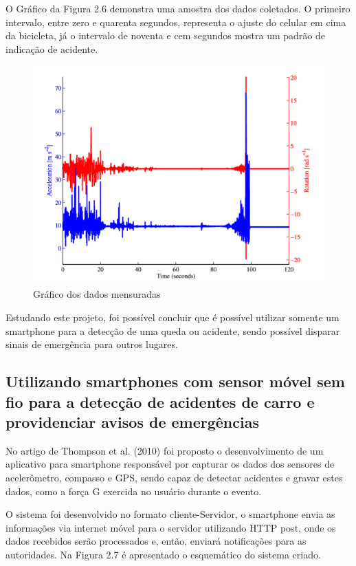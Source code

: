  O Gráfico da Figura 2.6 demonstra uma amostra dos dados coletados. O primeiro intervalo, entre zero e quarenta segundos, representa o ajuste do celular em cima da bicicleta, já o intervalo de noventa e cem segundos mostra um padrão de indicação de acidente.

\begin{figure}[H]

 \caption{Gráfico dos dados mensuradas}
  \includegraphics[width=150mm]{images/Cap2/grafico_acelera.png}
    
\end{figure}

Estudando este projeto, foi possível concluir que é possível utilizar somente um smartphone para a detecção de uma queda ou acidente, sendo possível disparar sinais de emergência para outros lugares.

\subsection{Utilizando smartphones com sensor móvel sem fio para a detecção de acidentes de carro e providenciar avisos de emergências}

No artigo de Thompson et al. (2010) foi proposto o desenvolvimento de um aplicativo para smartphone responsável por capturar os dados dos sensores de acelerômetro, compasso e GPS, sendo capaz de detectar acidentes e gravar estes dados, como a força G exercida no usuário durante o evento.

O sistema foi desenvolvido no formato cliente-Servidor, o smartphone envia as informações via internet móvel para o servidor utilizando HTTP post, onde os dados recebidos serão processados e, então, enviará notificações para as autoridades. Na Figura 2.7 é apresentado o esquemático do sistema criado.

